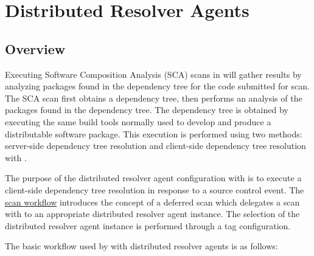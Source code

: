 \chapter{Distributed Resolver Agents}\label{sec:resolver-agents}

\section{Overview}

Executing Software Composition Analysis (SCA) scans in \cxone will gather results
by analyzing packages found in the dependency tree for the code submitted for scan.  
The \cxone SCA scan first obtains a dependency tree, then performs an analysis
of the packages found in the dependency tree. The dependency
tree is obtained by executing the same build tools normally used to develop and produce a
distributable software package.  This execution is performed using two methods: server-side 
dependency tree resolution and client-side dependency tree resolution with \scaresolver.

The purpose of the distributed resolver agent configuration with \cxoneflow is to execute a
client-side dependency tree resolution in response to a source control event.  The \cxone
\hyperref[sec:overview]{scan workflow} introduces the concept of a deferred scan which delegates
a scan with \scaresolver to an appropriate distributed resolver agent instance.  The selection of
the distributed resolver agent instance is performed through a tag configuration.

The basic workflow used by \cxoneflow with distributed resolver agents is as follows:

